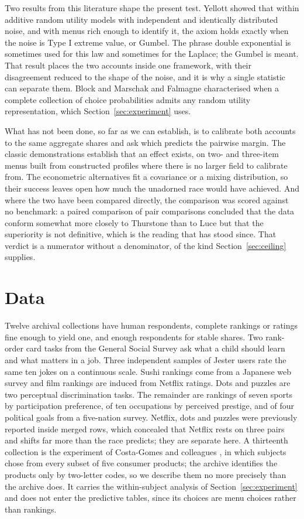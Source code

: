 \documentclass[11pt]{article}
\begin{document}
Two results from this literature shape the present test. Yellott \cite{yellott1977}
showed that within additive random utility models with independent and identically
distributed noise, and with menus rich enough to identify it, the axiom holds
exactly when the noise is Type I extreme value, or Gumbel. The phrase double
exponential is sometimes used for this law and sometimes for the Laplace; the
Gumbel is meant. That result places the two accounts inside one framework, with
their disagreement reduced to the shape of the noise, and it is why a single
statistic can separate them. Block and Marschak \cite{block1960} and Falmagne
\cite{falmagne1978} characterised when a complete collection of choice
probabilities admits any random utility representation, which
Section~\ref{sec:experiment} uses.

What has not been done, so far as we can establish, is to calibrate both accounts
to the same aggregate shares and ask which predicts the pairwise margin. The
classic demonstrations establish that an effect exists, on two- and three-item
menus built from constructed profiles where there is no larger field to calibrate
from. The econometric alternatives fit a covariance or a mixing distribution, so
their success leaves open how much the unadorned race would have achieved. And
where the two have been compared directly, the comparison was scored against no
benchmark: a paired comparison of pair comparisons \cite{rumelhart1965} concluded
that the data conform somewhat more closely to Thurstone than to Luce but that the
superiority is not definitive, which is the reading that has stood since. That
verdict is a numerator without a denominator, of the kind
Section~\ref{sec:ceiling} supplies.

\section{Data}
\label{sec:data}

Twelve archival collections have human respondents, complete rankings or ratings fine
enough to yield one, and enough respondents for stable shares. Two rank-order card
tasks from the General Social Survey ask what a child should learn and what matters in
a job. Three independent samples of Jester users rate the same ten jokes on a
continuous scale. Sushi rankings come from a Japanese web survey and film rankings are
induced from Netflix ratings. Dots and puzzles are two perceptual discrimination tasks.
The remainder are rankings of seven sports by participation preference, of ten
occupations by perceived prestige, and of four political goals from a five-nation
survey. Netflix, dots and puzzles were previously reported inside merged rows, which
concealed that Netflix rests on three pairs and shifts far more than the race predicts;
they are separate here. A thirteenth collection is the experiment of Costa-Gomes and
colleagues \cite{costagomes2022}, in which subjects chose from every subset of five
consumer products; the archive identifies the products only by two-letter codes, so we
describe them no more precisely than the archive does. It carries the within-subject
analysis of Section~\ref{sec:experiment} and does not enter the predictive tables,
since its choices are menu choices rather than rankings.
\end{document}
